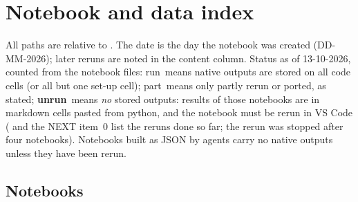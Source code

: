 \section{Notebook and data index}\label{sec:index}

\providecommand{\idxrun}{\textsf{run}}
\providecommand{\idxpart}{\textsf{part}}
\providecommand{\idxunrun}{\textbf{\textsf{unrun}}}

All paths are relative to . The date is the day the notebook was created (DD-MM-2026);
later reruns are noted in the content column. Status as of 13-10-2026, counted from the notebook files:
\idxrun\ means native outputs are stored on all code cells (or all but one set-up cell); \idxpart\ means only partly rerun or
ported, as stated; \idxunrun\ means \emph{no} stored outputs: results of those notebooks are in markdown cells pasted from
python, and the notebook must be rerun in VS Code ( and the NEXT item~0 list the reruns done
so far; the rerun was stopped after four notebooks). Notebooks built as JSON by agents carry no native outputs unless
they have been rerun.

\subsection{Notebooks}\label{sec:index-nb}


